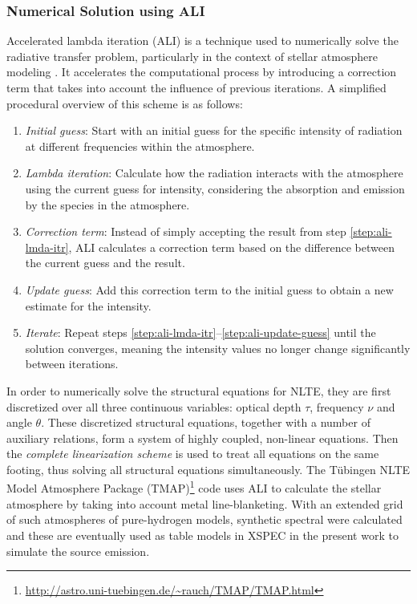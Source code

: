     		\subsubsection{Numerical Solution using ALI}
    			Accelerated lambda iteration (ALI) is a technique used to numerically solve the radiative transfer problem, particularly in the context of stellar atmosphere modeling \cite{hubeny2003accelerated}. It accelerates the computational process by introducing a correction term that takes into account the influence of previous iterations. A simplified procedural overview of this scheme is as follows:
				\begin{enumerate}
					\item \textit{Initial guess}: Start with an initial guess for the specific intensity of radiation at different frequencies within the atmosphere. \label{step:ali-init-guess}
					\item \textit{Lambda iteration}: Calculate how the radiation interacts with the atmosphere using the current guess for intensity, considering the absorption and emission by the species in the atmosphere. \label{step:ali-lmda-itr}
					\item \textit{Correction term}: Instead of simply accepting the result from step \ref{step:ali-lmda-itr}, ALI calculates a correction term based on the difference between the current guess and the result. \label{step:ali-corr-term}
					\item \textit{Update guess}: Add this correction term to the initial guess to obtain a new estimate for the intensity. \label{step:ali-update-guess}
					\item \textit{Iterate}: Repeat steps \ref{step:ali-lmda-itr}--\ref{step:ali-update-guess} until the solution converges, meaning the intensity values no longer change significantly between iterations. \label{step:ali-iterate}
				\end{enumerate}
				
				In order to numerically solve the structural equations for NLTE, they are first discretized over all three continuous variables: optical depth $\tau$, frequency $\nu$ and angle $\theta$. These discretized structural equations, together with a number of auxiliary relations, form a system of highly coupled, non-linear equations. Then the \textit{complete linearization scheme} \cite{auer1970non} is used to treat all equations on the same footing, thus solving all structural equations simultaneously. The T\"{u}bingen NLTE Model Atmosphere Package (TMAP)\footnote{\url{http://astro.uni-tuebingen.de/~rauch/TMAP/TMAP.html}} code uses ALI to calculate the stellar atmosphere by taking into account metal line-blanketing. With an extended grid of such atmospheres of pure-hydrogen models, synthetic spectral were calculated and these are eventually used as table models in XSPEC in the present work to simulate the source emission.
    	

